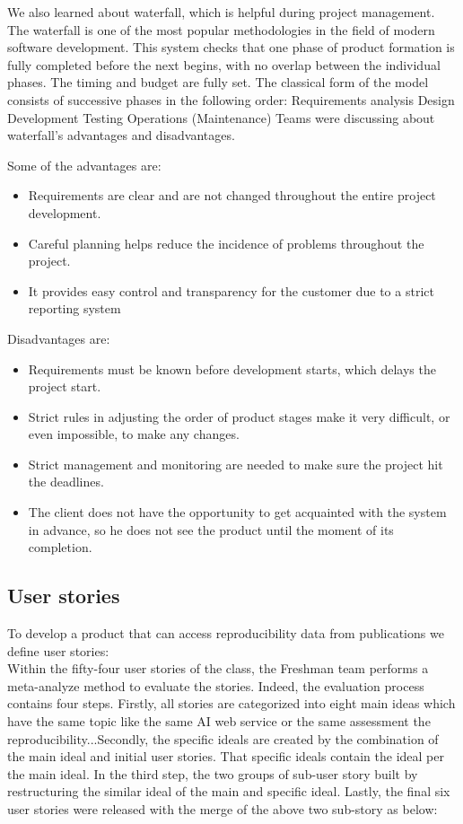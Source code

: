 \documentclass[
10pt, %
a4paper, %
oneside, %
headinclude,footinclude, %
BCOR5mm, %
]{scrartcl}
\begin{document}
 We also learned about waterfall, which is helpful during project management. The waterfall is one of the most popular methodologies in the field of modern software development. This system checks that one phase of product formation is fully completed before the next begins, with no overlap between the individual phases. The timing and budget are fully set. The classical form of the model consists of successive phases in the following order: Requirements analysis Design Development Testing Operations (Maintenance) Teams were discussing about waterfall’s advantages and disadvantages.  

Some of the advantages are: 
\begin{itemize}	
\item Requirements are clear and are not changed throughout the entire project development.
 \item Careful planning helps reduce the incidence of problems throughout the project. 
 \item It provides easy control and transparency for the customer due to a strict reporting system    
 \end{itemize}
 Disadvantages are: 
 \begin{itemize}	
\item	 Requirements must be known before development starts, which delays the project start.
\item	 Strict rules in adjusting the order of product stages make it very difficult, or even impossible, to make any changes.
\item Strict management and monitoring are needed to make sure the project hit the deadlines.  
\item	 The client does not have the opportunity to get acquainted with the system in advance, so he does not see the product until the moment of its completion.
\end{itemize}

\subsection{User stories}
To develop a product that can access reproducibility data from publications we define user stories:\\
Within the fifty-four user stories of the class, the Freshman team performs a meta-analyze method to evaluate the stories. Indeed, the evaluation process contains four steps. Firstly, all stories are categorized into eight main ideas which have the same topic like the same AI web service or the same assessment the reproducibility...Secondly, the specific ideals are created by the combination of the main ideal and initial user stories. That specific ideals contain the ideal per the main ideal. In the third step, the two groups of sub-user story built by restructuring the similar ideal of the main and specific ideal. Lastly, the final six user stories were released with the merge of the above two sub-story as below:
\end{document}
